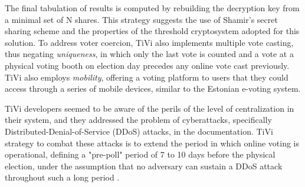 \documentclass[../access.tex]{subfiles}
\begin{document}
\par
The final tabulation of results is computed by rebuilding the decryption key from a minimal set of N shares. This strategy suggests the use of Shamir's secret sharing scheme and the  properties of the threshold cryptosystem adopted for this solution. To address voter coercion, TiVi also implements multiple vote casting, thus negating \textit{uniqueness}, in which only the last vote is counted and a vote at a physical voting booth on election day precedes any online vote cast previously. TiVi also employs \textit{mobility}, offering a voting platform to users that they could access through a series of mobile devices, similar to the Estonian e-voting system.
\par
TiVi developers seemed to be aware of the perils of the level of centralization in their system, and they addressed the problem of cyberattacks, specifically Distributed-Denial-of-Service (DDoS) attacks, in the documentation. TiVi strategy to combat these attacks is to extend the period in which online voting is operational, defining a "pre-poll" period of 7 to 10 days before the physical election, under the assumption that no adversary can sustain a DDoS attack throughout such a long period \cite{Tivi2021a}.
\end{document}
